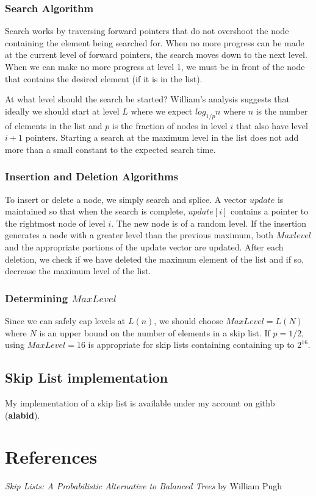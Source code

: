 \documentclass[12pt]{article}
\begin{document}
\subsubsection*{Search Algorithm}
Search works by traversing forward pointers
that do not overshoot the node containing the element
being searched for. When no more progress can be
made at the current level of forward pointers, the
search moves down to the next level. When we can make
no more progress at level 1, we must be in front
of the node that contains the desired element (if 
it is in the list).

At what level should the search be started? William's
analysis suggests that ideally we should start
at level $L$ where we expect $log_{1/p}n$ where
$n$ is the number of elements in the list and
$p$ is the fraction of nodes in level $i$ that
also have level $i+1$ pointers. Starting a search
at the maximum level in the list does not add more
than a small constant to the expected search time.

\subsubsection*{Insertion and Deletion Algorithms}
To insert or delete a node, we simply search and
splice. A vector $update$ is maintained so that when
the search is complete, $update[i]$ contains a pointer
to the rightmost node of level $i$. The new node
is of a random level.
If the insertion generates a node with a greater level
than the previous maximum, both $Maxlevel$ 
and the appropriate portions of the update vector
are updated. After each deletion, we check if we have
deleted the maximum element of the list and if so,
decrease the maximum level of the list.

\subsubsection*{Determining $MaxLevel$}
Since we can safely cap levels at $L(n)$, we should
choose $MaxLevel = L(N)$ where $N$ is an upper bound
on the number of elements in a skip list. If $p = 1/2$,
using $MaxLevel = 16$ is appropriate for skip lists
containing containing up to $2^{16}$.

\subsection*{Skip List implementation}
My implementation of a skip list is available under
my account on githb (\textbf{alabid}).

\section*{References}
\emph{Skip Lists: A Probabilistic Alternative to Balanced Trees} by William Pugh
\end{document}
